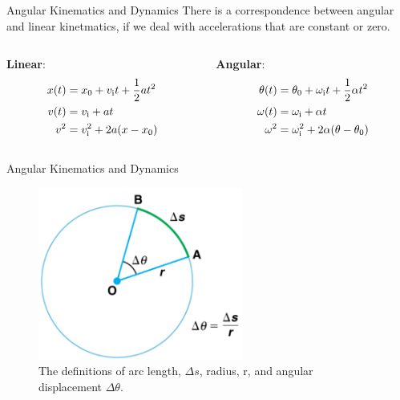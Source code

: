\documentclass{beamer}
\begin{document}
\begin{frame}{Angular Kinematics and Dynamics}
There is a correspondence between \alert{angular and linear kinetmatics}, if we deal with accelerations that are constant or zero.
\begin{columns}[T]
\begin{column}{0.5\textwidth}
\centering
\textbf{Linear}:
\begin{align}
x(t) &= x_{\rm 0} + v_{\rm i}t + \frac{1}{2}at^2 \\
v(t) &= v_{\rm i} + at \\
v^2 &= v_{\rm i}^2 + 2a(x-x_{\rm 0})
\end{align}
\end{column}
\begin{column}{0.5\textwidth}
\centering
\textbf{Angular}:
\begin{align}
\theta(t) &= \theta_{\rm 0} + \omega_{\rm i}t + \frac{1}{2}\alpha t^2 \\
\omega(t) &= \omega_{\rm i} + \alpha t \\
\omega^2 &= \omega_{\rm i}^2 + 2\alpha(\theta-\theta_{\rm 0})
\end{align}
\end{column}
\end{columns}
\end{frame}

\begin{frame}{Angular Kinematics and Dynamics}
\begin{figure}
\centering
\includegraphics[width=0.6\textwidth]{figures/circle1.png}
\caption{\label{fig:circle1} The definitions of arc length, $\Delta s$, radius, r, and angular displacement $\Delta\theta$.}
\end{figure}
\end{frame}
\end{document}
